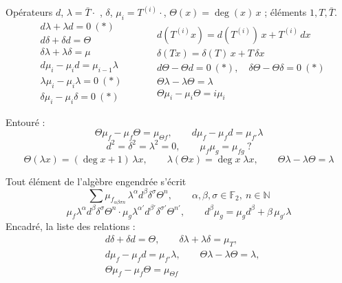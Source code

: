 \documentclass[11pt,a4paper]{article}
\begin{document}

Opérateurs $d$, $\lambda = \bar{T}\cdot$ , $\delta$, $\mu_i = T^{(i)}\cdot$, $\Theta(x) = \deg(x)\, x$ ; éléments $1, T, \bar{T}$.
\struck{$\Lambda\Phi \otimes \Lambda\Psi$}
\[
\begin{aligned}
& d\lambda + \lambda d = 0 \ (*) \\
& d\delta + \delta d = \Theta \\
& \delta\lambda + \lambda\delta = \mu \\
& d\mu_i - \mu_i d = \mu_{i-1} \lambda \\
& \lambda\mu_i - \mu_i\lambda = 0 \ (*) \\
& \delta\mu_i - \mu_i\delta = 0 \ (*)
\end{aligned}
\qquad
\begin{aligned}
& d(T^{(i)} x) = d(T^{(i)})\, x + T^{(i)}\, dx \\
& \delta(T x) = \delta(T)\, x + T\, \delta x \\
& d\Theta - \Theta d = 0 \ (*) , \quad \delta\Theta - \Theta\delta = 0 \ (*) \\
& \Theta\lambda - \lambda\Theta = \lambda \\
& \Theta\mu_i - \mu_i\Theta = i\mu_i
\end{aligned}
\]

Entouré :
\[
\Theta\mu_f - \mu_f\Theta = \mu_{\Theta f} , \qquad d\mu_f - \mu_f d = \mu_{f'} \lambda
\]
\[
d^2 = \delta^2 = \lambda^2 = 0 , \qquad \mu_f \mu_g = \mu_{fg} \ ?
\]
\[
\Theta(\lambda x) = (\deg x + 1)\, \lambda x , \qquad \lambda(\Theta x) = \deg x \; \lambda x ,
\qquad \Theta\lambda - \lambda\Theta = \lambda
\]

Tout élément de l’algèbre engendrée s’écrit
\[
\sum \mu_{f_{\alpha\beta\sigma n}} \, \lambda^\alpha d^\beta \delta^\sigma \Theta^n ,
\qquad \alpha, \beta, \sigma \in \mathbb{F}_2 , \ n \in \mathbb{N}
\]
\[
\mu_f \lambda^\alpha d^\beta \delta^\sigma \Theta^n \cdot \mu_g \lambda^{\alpha'} d^{\beta'} \delta^{\sigma'} \Theta^{n'} ,
\qquad d^\beta \mu_g = \mu_g d^\beta + \beta\, \mu_{g'} \lambda
\]
Encadré, la liste des relations :
\[
\begin{aligned}
& d\delta + \delta d = \Theta , \qquad \delta\lambda + \lambda\delta = \mu_T , \\
& d\mu_f - \mu_f d = \mu_{f'}\lambda , \qquad \Theta\lambda - \lambda\Theta = \lambda , \\
& \Theta\mu_f - \mu_f\Theta = \mu_{\Theta f}
\end{aligned}
\]
 \quad {}
\end{document}
